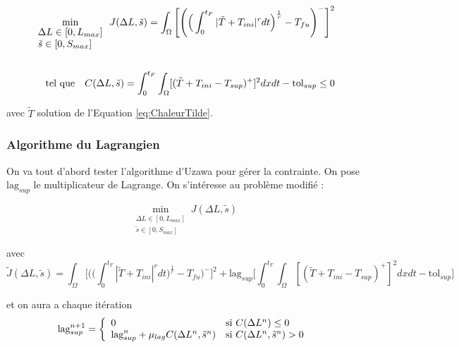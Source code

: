 \documentclass[11pt,a4paper]{article}
\begin{document}
\begin{equation*}
\label{eq:pbOptim}
\begin{aligned}
\min_{\begin{array}{l}
	\Delta L\in[0,L_{max}] \\
	\tilde{s}\in [0,S_{max}]
	\end{array}} J(\Delta L,\tilde{s})=\int_{\Omega}\Bigg[\Bigg(\Big(\int_{0}^{t_F}|\tilde{T}+T_{ini}|^rdt\Big)^{\frac{1}{r}}-T_{fu}\Bigg)^-\Bigg]^2 \\
\\
\textrm{tel\,\,que\quad} C(\Delta L,\tilde{s})=\int_{0}^{t_F}\int_{\Omega}[(\tilde{T}+T_{ini}-T_{sup})^+]^2dxdt-\textrm{tol}_{sup}\leq 0
\end{aligned}
\end{equation*}

avec $\tilde T$ solution de l'Equation \ref{eq:ChaleurTilde}.

\vspace{0cm}

\subsubsection*{Algorithme du Lagrangien}

On va tout d'abord tester l'algorithme d'Uzawa pour gérer la contrainte. On pose $\textrm{lag}_{sup}$ le multiplicateur de Lagrange. On s'intéresse au problème modifié :

\begin{equation}
\min_{\begin{array}{l}
	\Delta L\in[0,L_{max}] \\
	\tilde{s}\in [0,S_{max}]
	\end{array}} J(\Delta L,\tilde{s})
\end{equation}

avec 
\begin{equation}
\tilde{J}(\Delta L,\tilde{s})=\int_{\Omega}\Bigg[\Bigg(\Big(\int_{0}^{t_F}|\tilde{T}+T_{ini}|^rdt\Big)^{\frac{1}{r}}-T_{fu}\Bigg)^-\Bigg]^2+\textrm{lag}_{sup} \Bigg[\int_{0}^{t_F}\int_{\Omega}[(\tilde{T}+T_{ini}-T_{sup})^+]^2dxdt-\textrm{tol}_{sup}\Bigg]
\end{equation}

et on aura a chaque itération 
\begin{equation}
\textrm{lag}_{sup}^{n+1}=\left\{
\begin{array}{ll}
0 & \textrm{si\,\,}C(\Delta L^n)\leq0 \\
\textrm{lag}_{sup}^n+\mu_{lag}C(\Delta L^n,\tilde{s}^n) & \textrm{si\,\,}C(\Delta L^n,\tilde{s}^n)>0
\end{array}
\right.
\end{equation}
\end{document}
